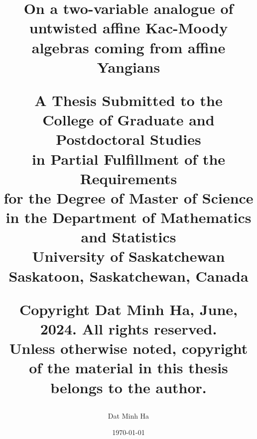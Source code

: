 \title{
    \texorpdfstring{\Huge On a two-variable analogue of untwisted affine Kac-Moody algebras coming from affine Yangians}

    \vfill

    \begin{centering}
        \normalsize A Thesis Submitted to the
        \\
        College of Graduate and Postdoctoral Studies
        \\
        in Partial Fulfillment of the Requirements
        \\
        for the Degree of Master of Science
        \\
        in the Department of Mathematics and Statistics
        \\
        University of Saskatchewan
        \\
        Saskatoon, Saskatchewan, Canada
    \end{centering}

    \vfill

    \begin{centering}
        \normalsize \textcopyright Copyright Dat Minh Ha, June, 2024. All rights reserved.
        \\
        Unless otherwise noted, copyright of the material in this thesis belongs to the author.
    \end{centering}

    \vfill

    \author{\normalsize Dat Minh Ha}
    \date{\normalsize \today}
}

\maketitle